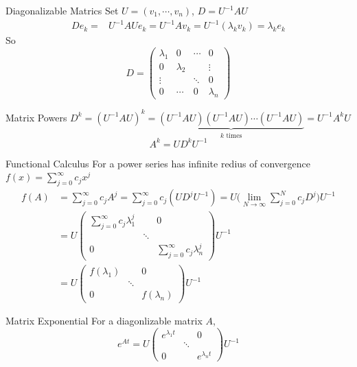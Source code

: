 \documentclass{beamer}
\begin{document}
\begin{frame}
\begin{block}{Diagonalizable Matrics}
Set $U=(v_1,\cdots,v_n)$, $D=U^{-1}AU$
\begin{align*}
De_k=&U^{-1}AUe_k=U^{-1}Av_k=U^{-1}(\lambda_k v_k)=\lambda_ke_k
\end{align*}
So
$$D=\begin{pmatrix}
\lambda_1&0&\cdots&0\\
0&\lambda_2&&\vdots\\
\vdots&&\ddots&0\\
0&\cdots&0&\lambda_n
\end{pmatrix}$$
\end{block}
\begin{block}{Matrix Powers}
$D^k=(U^{-1}AU)^k=\underbrace{(U^{-1}AU)(U^{-1}AU)\cdots(U^{-1}AU)}_{k\text{ times}}=U^{-1}A^kU$
$$A^k=UD^kU^{-1}$$
\end{block}
\end{frame}

\begin{frame}
\begin{block}{Functional Calculus}
For a power series has infinite redius of convergence $f(x)=\sum\limits_{j=0}^{\infty}c_jx^j$
\begin{align*}
f(A)&=\sum\limits_{j=0}^{\infty}c_jA^j=\sum\limits_{j=0}^{\infty}c_j(UD^jU^{-1})=U\Big(\lim_{N\rightarrow\infty}\sum\limits_{j=0}^{N}c_jD^j\Big)U^{-1}\\
&=U\begin{pmatrix}
\sum\limits_{j=0}^{\infty}c_j\lambda_1^j&&0\\
&\ddots&\\
0&&\sum\limits_{j=0}^{\infty}c_j\lambda_n^j
\end{pmatrix}U^{-1}\\
&=U\begin{pmatrix}
f(\lambda_1)&&0\\
&\ddots&\\
0&&f(\lambda_n)
\end{pmatrix}U^{-1}
\end{align*}
\end{block}
\end{frame}

\begin{frame}
\begin{block}{Matrix Exponential}
For a diagonlizable matrix $A$,
$$e^{At}=U\begin{pmatrix}
e^{\lambda_1t}&&0\\
&\ddots&\\
0&&e^{\lambda_nt}
\end{pmatrix}U^{-1}$$
\end{block}
\end{frame}
\end{document}
